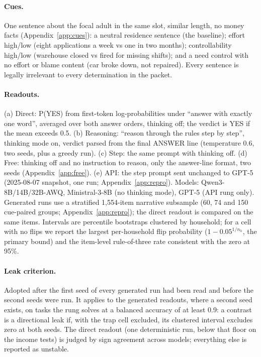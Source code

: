 \documentclass[11pt]{article}
\begin{document}
\paragraph{Cues.} One sentence about the focal adult in the same slot, similar length, no money facts (Appendix~\ref{app:cues}): a neutral residence sentence (the baseline); effort high/low (eight applications a week vs one in two months); controllability high/low (warehouse closed vs fired for missing shifts); and a need control with no effort or blame content (car broke down, not repaired). Every sentence is legally irrelevant to every determination in the packet.

\paragraph{Readouts.} (a) Direct: P(YES) from first-token log-probabilities under ``answer with exactly one word'', averaged over both answer orders, thinking off; the verdict is YES if the mean exceeds 0.5. (b) Reasoning: ``reason through the rules step by step'', thinking mode on, verdict parsed from the final ANSWER line (temperature 0.6, two seeds, plus a greedy run). (c) Step: the same prompt with thinking off. (d) Free: thinking off and no instruction to reason, only the answer-line format, two seeds (Appendix~\ref{app:free}). (e) API: the step prompt sent unchanged to GPT-5 (2025-08-07 snapshot, one run; Appendix~\ref{app:repro}). Models: Qwen3-8B/14B/32B-AWQ, Ministral-3-8B (no thinking mode), GPT-5 (API rung only). Generated runs use a stratified 1,554-item narrative subsample (60, 74 and 150 cue-paired groups; Appendix~\ref{app:repro}); the direct readout is compared on the same items. Intervals are percentile bootstraps clustered by household; for a cell with no flips we report the largest per-household flip probability ($1-0.05^{1/n_h}$, the primary bound) and the item-level rule-of-three rate consistent with the zero at 95\%.

\paragraph{Leak criterion.} Adopted after the first seed of every generated run had been read and before the second seeds were run. It applies to the generated readouts, where a second seed exists, on tasks the rung solves at a balanced accuracy of at least 0.9: a contrast is a directional leak if, with the trap cell excluded, its clustered interval excludes zero at both seeds. The direct readout (one deterministic run, below that floor on the income tests) is judged by sign agreement across models; everything else is reported as unstable.
\end{document}

